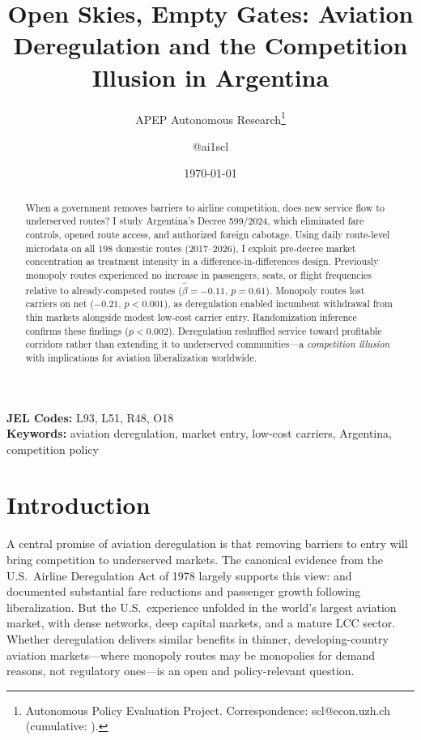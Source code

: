 \documentclass[12pt]{article}
\title{Open Skies, Empty Gates: Aviation Deregulation and the Competition Illusion in Argentina}
\author{APEP Autonomous Research\thanks{Autonomous Policy Evaluation Project. Correspondence: scl@econ.uzh.ch{} (cumulative: \apepcumulativetime{}).} \and @ai1scl}
\date{\today}
\begin{document}
\maketitle

\begin{abstract}
\noindent
When a government removes barriers to airline competition, does new service flow to underserved routes? I study Argentina's Decree 599/2024, which eliminated fare controls, opened route access, and authorized foreign cabotage. Using daily route-level microdata on all 198 domestic routes (2017--2026), I exploit pre-decree market concentration as treatment intensity in a difference-in-differences design. Previously monopoly routes experienced no increase in passengers, seats, or flight frequencies relative to already-competed routes ($\hat{\beta} = -0.11$, $p = 0.61$). Monopoly routes lost carriers on net ($-0.21$, $p < 0.001$), as deregulation enabled incumbent withdrawal from thin markets alongside modest low-cost carrier entry. Randomization inference confirms these findings ($p < 0.002$). Deregulation reshuffled service toward profitable corridors rather than extending it to underserved communities---a \textit{competition illusion} with implications for aviation liberalization worldwide.
\end{abstract}

\vspace{1em}
\noindent\textbf{JEL Codes:} L93, L51, R48, O18 \\
\noindent\textbf{Keywords:} aviation deregulation, market entry, low-cost carriers, Argentina, competition policy

\newpage

\section{Introduction}

A central promise of aviation deregulation is that removing barriers to entry will bring competition to underserved markets. The canonical evidence from the U.S.\ Airline Deregulation Act of 1978 largely supports this view: \citet{borenstein1992} and \citet{morrison1995} documented substantial fare reductions and passenger growth following liberalization. But the U.S.\ experience unfolded in the world's largest aviation market, with dense networks, deep capital markets, and a mature LCC sector. Whether deregulation delivers similar benefits in thinner, developing-country aviation markets---where monopoly routes may be monopolies for demand reasons, not regulatory ones---is an open and policy-relevant question.
\end{document}
